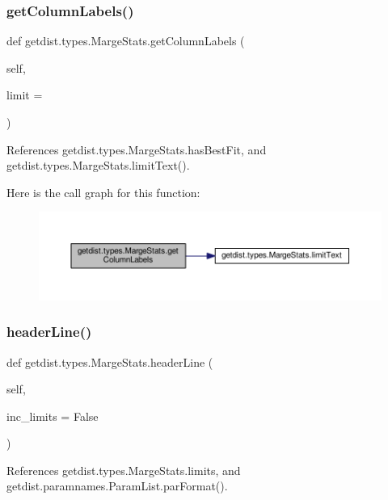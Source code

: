 \subsubsection{\texorpdfstring{get\+Column\+Labels()}{getColumnLabels()}}
{\footnotesize\ttfamily def getdist.\+types.\+Marge\+Stats.\+get\+Column\+Labels (\begin{DoxyParamCaption}\item[{}]{self,  }\item[{}]{limit = {} }\end{DoxyParamCaption})}



References getdist.\+types.\+Marge\+Stats.\+has\+Best\+Fit, and getdist.\+types.\+Marge\+Stats.\+limit\+Text().

Here is the call graph for this function\+:
\nopagebreak
\begin{figure}[H]
\begin{center}
\leavevmode
\includegraphics[width=350pt]{classgetdist_1_1types_1_1MargeStats_a739268ba287cfaad79b4ba5039e832e8_cgraph}
\end{center}
\end{figure}
\mbox{\label{classgetdist_1_1types_1_1MargeStats_a2ddab13aed8fe2159f0a4d742bdad5c9}} 
\subsubsection{\texorpdfstring{header\+Line()}{headerLine()}}
{\footnotesize\ttfamily def getdist.\+types.\+Marge\+Stats.\+header\+Line (\begin{DoxyParamCaption}\item[{}]{self,  }\item[{}]{inc\+\_\+limits = {\ttfamily False} }\end{DoxyParamCaption})}



References getdist.\+types.\+Marge\+Stats.\+limits, and getdist.\+paramnames.\+Param\+List.\+par\+Format().



